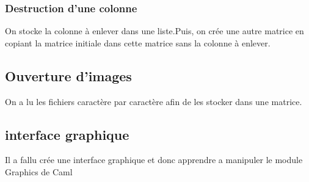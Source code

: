 \documentclass{article}
\begin{document}
\subsubsection{Destruction d'une colonne}

On stocke la colonne à enlever dans une liste.Puis, on crée une autre matrice en copiant la matrice initiale dans cette matrice sans la colonne à enlever.
 
\subsection{Ouverture d'images}

On a lu les fichiers caractère par caractère afin de les stocker dans une matrice. 


\subsection{interface graphique}
Il a fallu crée une interface graphique et donc apprendre a manipuler le module Graphics de Caml
\end{document}
